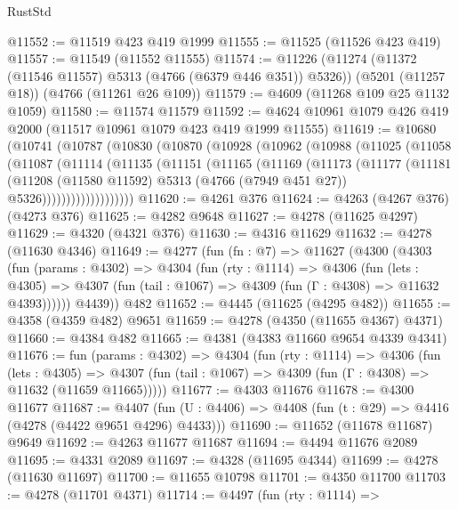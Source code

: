 \begin{lexlean}{RustStd}
\begin{coremodule}
{\begin{coremodule}
{{{{{{{{{{{{{{{{{{{{{{{{{{{{{{{{{{{@11552 := @11519 @423 @419 @1999
@11555 := @11525 (@11526 @423 @419)
@11557 := @11549 (@11552 @11555)
@11574 := @11226
    (@11274 (@11372 (@11546 @11557) @5313 (@4766 (@6379 @446 @351)) @5326))
    (@5201 (@11257 @18))
    (@4766 (@11261 @26 @109))
@11579 := @4609 (@11268 @109 @25 @1132 @1059)
@11580 := @11574 @11579
@11592 := @4624 @10961 @1079 @426 @419 @2000 (@11517 @10961 @1079 @423 @419 @1999 @11555)
@11619 := @10680
    (@10741
      (@10787
        (@10830
          (@10870
            (@10928
              (@10962
                (@10988
                  (@11025
                    (@11058
                      (@11087
                        (@11114
                          (@11135
                            (@11151
                              (@11165
                                (@11169
                                  (@11173
                                    (@11177
                                      (@11181
                                        (@11208
                                          (@11580 @11592)
                                          @5313
                                          (@4766 (@7949 @451 @27))
                                          @5326)))))))))))))))))))
@11620 := @4261 @376
@11624 := @4263 (@4267 @376) (@4273 @376)
@11625 := @4282 @9648
@11627 := @4278 (@11625 @4297)
@11629 := @4320 (@4321 @376)
@11630 := @4316 @11629
@11632 := @4278 (@11630 @4346)
@11649 := @4277
    (fun (fn : @7) =>
    @11627
      (@4300
        (@4303
          (fun (params : @4302) =>
          @4304
            (fun (rty : @1114) =>
            @4306
              (fun (lets : @4305) =>
              @4307 (fun (tail : @1067) => @4309 (fun (Γ : @4308) => @11632 @4393))))))
        @4439))
    @482
@11652 := @4445 (@11625 (@4295 @482))
@11655 := @4358 (@4359 @482) @9651
@11659 := @4278 (@4350 (@11655 @4367) @4371)
@11660 := @4384 @482
@11665 := @4381 (@4383 @11660 @9654 @4339 @4341)
@11676 := fun (params : @4302) =>
  @4304
    (fun (rty : @1114) =>
    @4306
      (fun (lets : @4305) =>
      @4307 (fun (tail : @1067) => @4309 (fun (Γ : @4308) => @11632 (@11659 @11665)))))
@11677 := @4303 @11676
@11678 := @4300 @11677
@11687 := @4407
    (fun (U : @4406) => @4408 (fun (t : @29) => @4416 (@4278 (@4422 @9651 @4296) @4433)))
@11690 := @11652 (@11678 @11687) @9649
@11692 := @4263 @11677 @11687
@11694 := @4494 @11676 @2089
@11695 := @4331 @2089
@11697 := @4328 (@11695 @4344)
@11699 := @4278 (@11630 @11697)
@11700 := @11655 @10798
@11701 := @4350 @11700
@11703 := @4278 (@11701 @4371)
@11714 := @4497
    (fun (rty : @1114) =>
}}}}}}}}}}}}}}}}}}}}}}}}}}}}}}}}}}}
\end{coremodule}}
\end{coremodule}
\end{lexlean}
